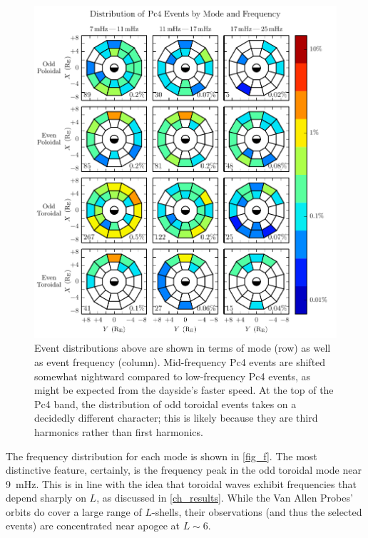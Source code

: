 \begin{figure}[!htb]
    \centering
    \includegraphics[width=\textwidth]{figures/mode_f.pdf}
    \caption[Observation Rate of Pc4 Events by Mode and Frequency]{
      Event distributions above are shown in terms of mode (row) as well as event frequency (column). Mid-frequency Pc4 events are shifted somewhat nightward compared to low-frequency Pc4 events, as might be expected from the dayside's faster \Alfven speed. At the top of the Pc4 band, the distribution of odd toroidal events takes on a decidedly different character; this is likely because they are third harmonics rather than first harmonics. 
    }
    \label{fig_mode_f}
\end{figure}

The frequency distribution for each mode is shown in \cref{fig_f}. The most distinctive feature, certainly, is the frequency peak in the odd toroidal mode near \SI{9}{\mHz}. This is in line with the idea that toroidal waves exhibit frequencies that depend sharply on $L$, as discussed in \cref{ch_results}. While the Van Allen Probes' orbits do cover a large range of $L$-shells, their observations (and thus the selected events) are concentrated near apogee at $L \sim 6$. 

